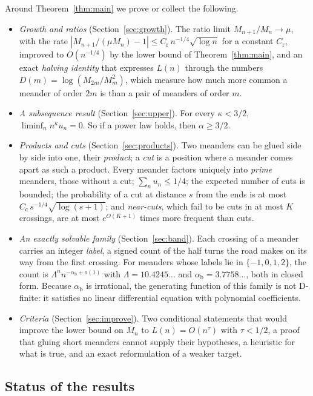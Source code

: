 Around Theorem~\ref{thm:main} we prove or collect the following.
\begin{itemize}
\item \emph{Growth and ratios} (Section~\ref{sec:growth}). The ratio limit $M_{n+1}/M_n\to\mu$,
with the rate $|M_{n+1}/(\mu M_n)-1|\le C_{\mathrm r}\,n^{-1/4}\sqrt{\log n}$ for a constant
$C_{\mathrm r}$, improved to $O(n^{-1/4})$ by the lower bound of Theorem~\ref{thm:main}, and an exact
\emph{halving identity} that expresses $L(n)$ through the numbers
$D(m)=\log(M_{2m}/M_m^2)$, which measure how much more common a meander of order $2m$ is than a pair
of meanders of order $m$.
\item \emph{A subsequence result} (Section~\ref{sec:upper}). For every $\kappa<3/2$,
$\liminf_n n^\kappa u_n=0$. So if a power law holds, then $\alpha\ge3/2$.
\item \emph{Products and cuts} (Section~\ref{sec:products}). Two meanders can be glued side by side
into one, their \emph{product}; a \emph{cut} is a position where a meander comes apart as such a
product. Every meander factors uniquely into \emph{prime} meanders, those without a cut;
$\sum_n u_n\le 1/4$; the expected number of cuts is bounded; the probability of a cut at distance $s$
from the ends is at most $C_{\mathrm c}\,s^{-1/4}\sqrt{\log(s+1)}$; and \emph{near-cuts}, which
fail to be cuts in at most $K$ crossings, are at most $e^{O(K+1)}$ times more frequent than cuts.
\item \emph{An exactly solvable family} (Section~\ref{sec:band}). Each crossing of a meander carries
an integer \emph{label}, a signed count of the half turns the road makes on its way from the first crossing. For
meanders whose labels lie in $\{-1,0,1,2\}$, the count is $\Lambda^n n^{-\alpha_{\mathrm b}+o(1)}$ with
$\Lambda=10.4245\ldots$ and $\alpha_{\mathrm b}=3.7758\ldots$, both in closed form. Because
$\alpha_{\mathrm b}$ is irrational, the generating function of this family is not D-finite: it
satisfies no linear differential equation with polynomial coefficients.
\item \emph{Criteria} (Section~\ref{sec:improve}). Two conditional statements that would improve
the lower bound on $M_n$ to $L(n)=O(n^\tau)$ with $\tau<1/2$, a proof that gluing short meanders cannot supply
their hypotheses, a heuristic for what is true, and an exact reformulation of a weaker target.
\end{itemize}

\subsection{Status of the results}\label{sec:status}

